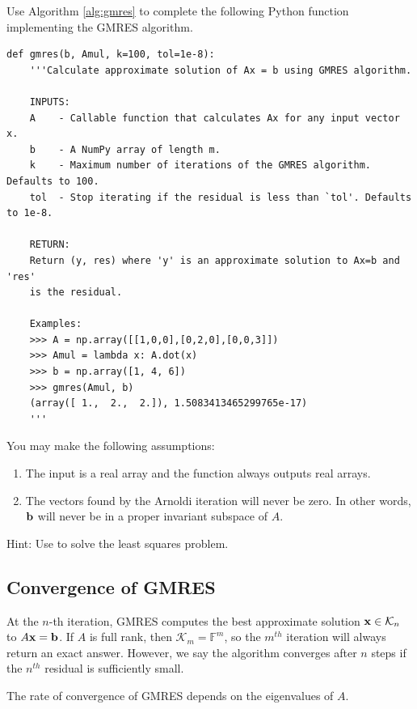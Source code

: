\begin{problem}
Use Algorithm \ref{alg:gmres} to complete the following Python function implementing the GMRES algorithm.
\begin{lstlisting}
def gmres(b, Amul, k=100, tol=1e-8):
    '''Calculate approximate solution of Ax = b using GMRES algorithm.
    
    INPUTS:
    A    - Callable function that calculates Ax for any input vector x.
    b    - A NumPy array of length m.
    k    - Maximum number of iterations of the GMRES algorithm. Defaults to 100.
    tol  - Stop iterating if the residual is less than `tol'. Defaults to 1e-8.
    
    RETURN:
    Return (y, res) where 'y' is an approximate solution to Ax=b and 'res' 
    is the residual.
    
    Examples:
    >>> A = np.array([[1,0,0],[0,2,0],[0,0,3]])
    >>> Amul = lambda x: A.dot(x)
    >>> b = np.array([1, 4, 6])
    >>> gmres(Amul, b)
    (array([ 1.,  2.,  2.]), 1.5083413465299765e-17)
    '''
\end{lstlisting}
You may make the following assumptions:
\begin{enumerate}
\item The input  is a real array and the function  always outputs real arrays.
\item The vectors found by the Arnoldi iteration will never be zero. In other words, ${\bf b}$ will never be in a proper invariant subspace of $A$.
\end{enumerate}

Hint: Use  to solve the least squares problem.
\label{prob:MyGMRES}
\end{problem}



\subsection*{Convergence of GMRES}
At the $n$-th iteration, GMRES computes the best approximate solution ${\bf x} \in \mathcal{K}_n$ to $A{\bf x} = {\bf b}$.
If $A$ is full rank, then $\mathcal{K}_m = \mathbb{F}^m$, so the $m^{th}$ iteration will always return an exact answer.
However, we say the algorithm converges after $n$ steps if the $n^{th}$ residual is sufficiently small.

The rate of convergence of GMRES depends on the eigenvalues of $A$.

